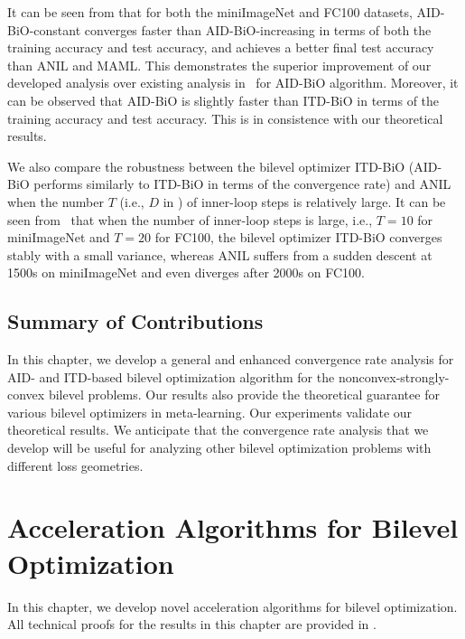 \documentclass{osudissert96}
\begin{document}
It can be seen from  that for both the miniImageNet and FC100 datasets, AID-BiO-constant converges  faster  than AID-BiO-increasing in terms of both the training accuracy and test accuracy, and achieves a better final test accuracy than ANIL and MAML. This demonstrates the superior improvement of our developed analysis over existing analysis in~\cite{ghadimi2018approximation} for AID-BiO algorithm.  
Moreover,  it can be observed that AID-BiO is slightly faster than ITD-BiO in terms of  the training accuracy and test accuracy. This is in consistence with our theoretical results. 


We also compare the robustness between the bilevel optimizer ITD-BiO (AID-BiO performs similarly to ITD-BiO in terms of the convergence rate) and ANIL when  the number $T$ (i.e., $D$ in )  of inner-loop steps is relatively large. 
It can be seen from~  that when the number of inner-loop steps is large, i.e., $T=10$ for miniImageNet and $T=20$ for FC100, the bilevel optimizer ITD-BiO converges stably with a small variance, whereas ANIL suffers from a sudden descent at 1500s on miniImageNet  and even diverges after 2000s on FC100. 

\section{Summary of Contributions}
In this chapter, we develop a general and enhanced convergence rate analysis for AID- and ITD-based bilevel optimization algorithm for the nonconvex-strongly-convex bilevel problems. Our results also provide the theoretical guarantee for various bilevel optimizers in meta-learning. Our experiments validate our theoretical results. We anticipate that the convergence rate analysis that we develop will be useful for analyzing other  bilevel optimization problems with different loss geometries. 

\chapter{Acceleration Algorithms for Bilevel Optimization}\label{chp_acc_bilevel}

In this chapter,  we develop novel acceleration algorithms for bilevel optimization. All technical proofs for the results in this chapter are provided in . 
\end{document}
